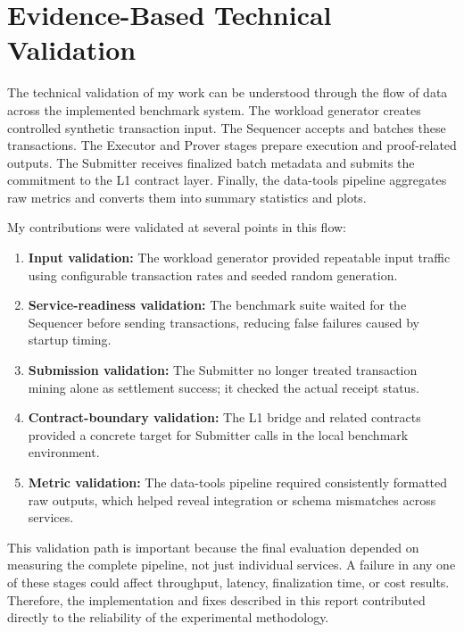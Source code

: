 \section{Evidence-Based Technical Validation}

The technical validation of my work can be understood through the flow of data across the implemented benchmark system. The workload generator creates controlled synthetic transaction input. The Sequencer accepts and batches these transactions. The Executor and Prover stages prepare execution and proof-related outputs. The Submitter receives finalized batch metadata and submits the commitment to the L1 contract layer. Finally, the data-tools pipeline aggregates raw metrics and converts them into summary statistics and plots.

My contributions were validated at several points in this flow:

\begin{enumerate}
    \item \textbf{Input validation:} The workload generator provided repeatable input traffic using configurable transaction rates and seeded random generation.

    \item \textbf{Service-readiness validation:} The benchmark suite waited for the Sequencer before sending transactions, reducing false failures caused by startup timing.

    \item \textbf{Submission validation:} The Submitter no longer treated transaction mining alone as settlement success; it checked the actual receipt status.

    \item \textbf{Contract-boundary validation:} The L1 bridge and related contracts provided a concrete target for Submitter calls in the local benchmark environment.

    \item \textbf{Metric validation:} The data-tools pipeline required consistently formatted raw outputs, which helped reveal integration or schema mismatches across services.
\end{enumerate}

This validation path is important because the final evaluation depended on measuring the complete pipeline, not just individual services. A failure in any one of these stages could affect throughput, latency, finalization time, or cost results. Therefore, the implementation and fixes described in this report contributed directly to the reliability of the experimental methodology.

